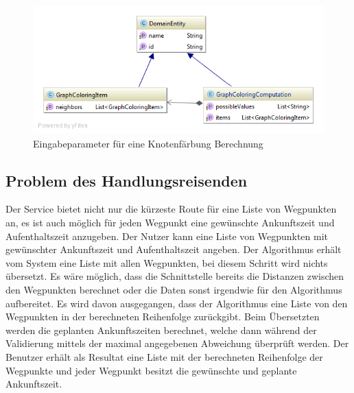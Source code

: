 \begin{figure}[h]
\centering
\includegraphics[scale=0.5]{images/probleme/graphcoloring.png}
\caption[Eingabeparameter für eine Knotenfärbung Berechnung]{Eingabeparameter für eine Knotenfärbung Berechnung \selfmade{}}
\label{fig:graphcoloring_input}
\end{figure}

%
%
%
%

\subsection{Problem des Handlungsreisenden}
Der Service bietet nicht nur die kürzeste Route für eine Liste von Wegpunkten an, es ist auch möglich für jeden Wegpunkt eine gewünschte Ankunftszeit und Aufenthaltszeit anzugeben. Der 
Nutzer kann eine Liste von Wegpunkten mit gewünschter Ankunftszeit und Aufenthaltszeit angeben. Der Algorithmus erhält vom System eine Liste mit allen Wegpunkten, bei diesem Schritt wird 
nichts übersetzt. Es wäre möglich, dass die Schnittstelle bereits die Distanzen zwischen den Wegpunkten berechnet oder die Daten sonst irgendwie für den Algorithmus aufbereitet. Es 
wird davon ausgegangen, dass der Algorithmus eine Liste von den Wegpunkten in der berechneten Reihenfolge zurückgibt. Beim Übersetzten werden die geplanten Ankunftszeiten berechnet, 
welche dann während der Validierung mittels der maximal angegebenen Abweichung überprüft werden. Der Benutzer erhält als Resultat eine Liste mit der berechneten Reihenfolge der 
Wegpunkte und jeder Wegpunkt besitzt die gewünschte und geplante Ankunftszeit.

